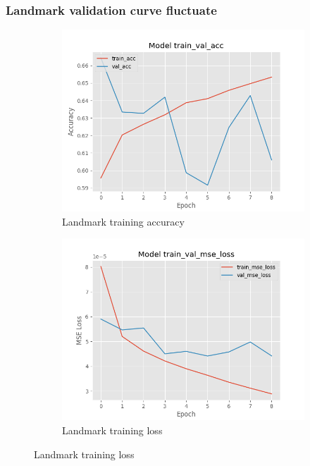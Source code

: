 \documentclass{article}
\begin{document}
\subsubsection{Landmark validation curve fluctuate}

\begin{figure}[ht]
  \centering
  \begin{subfigure}{0.45\textwidth}
    \centering
    \includegraphics[width=\textwidth]{Fig8}
    \caption{Landmark training accuracy}
    \label{Fig8}
  \end{subfigure}
  \begin{subfigure}{0.45\textwidth}
    \centering
    \includegraphics[width=\textwidth]{Fig9}
    \caption{Landmark training loss}
    \label{Fig9}
  \end{subfigure}
\end{figure}
\end{document}
